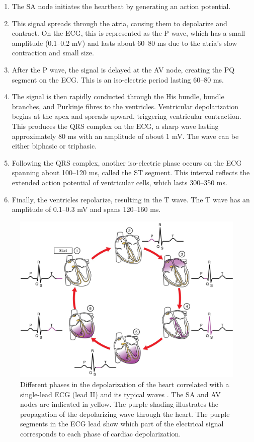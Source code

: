 \begin{enumerate}
    \item The SA node initiates the heartbeat by generating an action potential.
    
    \item This signal spreads through the atria, causing them to depolarize and contract. On the ECG, this is represented as the P wave, which has a small amplitude (0.1–0.2 mV) and lasts about 60–80 ms due to the atria's slow contraction and small size.
    
    \item After the P wave, the signal is delayed at the AV node, creating the PQ segment on the ECG. This is an iso-electric period lasting 60–80 ms.
    
    \item The signal is then rapidly conducted through the His bundle, bundle branches, and Purkinje fibres to the ventricles. Ventricular depolarization begins at the apex and spreads upward, triggering ventricular contraction. This produces the QRS complex on the ECG, a sharp wave lasting approximately 80 ms with an amplitude of about 1 mV. The wave can be either biphasic or triphasic.
    
    \item Following the QRS complex, another iso-electric phase occurs on the ECG spanning about 100–120 ms, called the ST segment. This interval reflects the extended action potential of ventricular cells, which lasts 300–350 ms.
    
    \item Finally, the ventricles repolarize, resulting in the T wave. The T wave has an amplitude of 0.1–0.3 mV and spans 120–160 ms.
\end{enumerate}

\begin{figure}
    \centering
    \includegraphics[width=0.7\linewidth]{Figures/1-intro/heart_conduction.jpg}
    \caption{Different phases in the depolarization of the heart correlated with a single-lead ECG (lead II) and its typical waves \cite{openstaxCardiovascularSystemHeart2022}. The SA and AV nodes are indicated in yellow. The purple shading illustrates the propagation of the depolarizing wave through the heart. The purple segments in the ECG lead show which part of the electrical signal corresponds to each phase of cardiac depolarization.}
    \label{fig:heart_conduction}
\end{figure}

